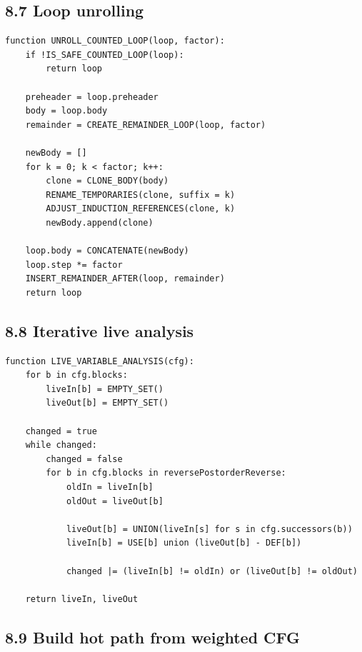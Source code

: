 \documentclass[10pt,letterpaper]{article}
\begin{document}
\subsection*{8.7 Loop unrolling}

\begin{verbatim}
function UNROLL_COUNTED_LOOP(loop, factor):
    if !IS_SAFE_COUNTED_LOOP(loop):
        return loop

    preheader = loop.preheader
    body = loop.body
    remainder = CREATE_REMAINDER_LOOP(loop, factor)

    newBody = []
    for k = 0; k < factor; k++:
        clone = CLONE_BODY(body)
        RENAME_TEMPORARIES(clone, suffix = k)
        ADJUST_INDUCTION_REFERENCES(clone, k)
        newBody.append(clone)

    loop.body = CONCATENATE(newBody)
    loop.step *= factor
    INSERT_REMAINDER_AFTER(loop, remainder)
    return loop
\end{verbatim}

\subsection*{8.8 Iterative live analysis}

\begin{verbatim}
function LIVE_VARIABLE_ANALYSIS(cfg):
    for b in cfg.blocks:
        liveIn[b] = EMPTY_SET()
        liveOut[b] = EMPTY_SET()

    changed = true
    while changed:
        changed = false
        for b in cfg.blocks in reversePostorderReverse:
            oldIn = liveIn[b]
            oldOut = liveOut[b]

            liveOut[b] = UNION(liveIn[s] for s in cfg.successors(b))
            liveIn[b] = USE[b] union (liveOut[b] - DEF[b])

            changed |= (liveIn[b] != oldIn) or (liveOut[b] != oldOut)

    return liveIn, liveOut
\end{verbatim}

\subsection*{8.9 Build hot path from weighted CFG}
\end{document}
